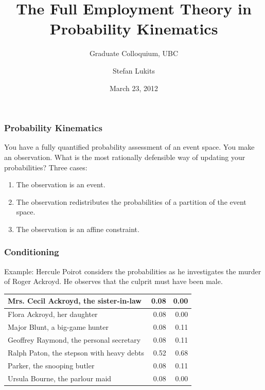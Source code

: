 \documentclass[xcolor=dvipsnames]{beamer}
\title{The Full Employment Theory \linebreak in Probability Kinematics}
\subtitle{Graduate Colloquium, UBC}
\author{Stefan Lukits}
\date{March 23, 2012}
\begin{document}
\begin{frame}
  \titlepage
\end{frame}

\begin{frame}
  \frametitle{Probability Kinematics}
  You have a fully quantified probability assessment of an event
  space. You make an observation. What is the most rationally
  defensible way of updating your probabilities? Three cases:
  \begin{enumerate}
  \item The observation is an event.
  \item The observation redistributes the probabilities of a
    partition of the event space.
  \item The observation is an affine constraint.
  \end{enumerate}
\end{frame}

\begin{frame}
  \frametitle{Conditioning}
  Example: Hercule Poirot considers the probabilities as he
  investigates the murder of Roger Ackroyd. He observes that the
  culprit must have been male.

\mbox{}

\mbox{}

  \begin{tabular}{|l|r|r|} \hline
    Mrs. Cecil Ackroyd, the sister-in-law & 0.08 & 0.00 \\ \hline
    Flora Ackroyd, her daughter & 0.08 & 0.00 \\ \hline
    Major Blunt, a big-game hunter & 0.08 & 0.11 \\ \hline
    Geoffrey Raymond, the personal secretary & 0.08 & 0.11 \\ \hline
    Ralph Paton, the stepson with heavy debts & 0.52 & 0.68 \\ \hline
    Parker, the snooping butler & 0.08 & 0.11 \\ \hline
    Ursula Bourne, the parlour maid & 0.08 & 0.00 \\ \hline
  \end{tabular}
\end{frame}
\end{document}
